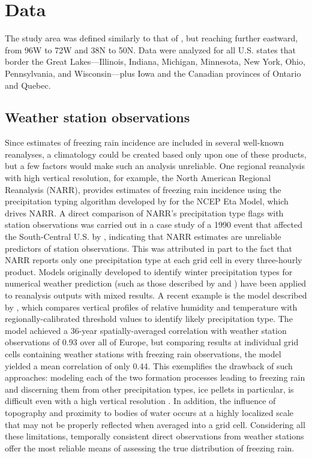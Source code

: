 \documentclass[twocol]{ametsoc}
\begin{document}
\section{Data}
The study area was defined similarly to that of \citet{cortinas2000climatology}, but reaching further eastward, from 96\degree W to 72\degree W and 38\degree N to 50\degree N. Data were analyzed for all U.S. states that border the Great Lakes---Illinois, Indiana, Michigan, Minnesota, New York, Ohio, Pennsylvania, and Wisconsin---plus Iowa and the Canadian provinces of Ontario and Quebec.

\subsection{Weather station observations}
Since estimates of freezing rain incidence are included in several well-known reanalyses, a climatology could be created based only upon one of these products, but a few factors would make such an analysis unreliable. One regional reanalysis with high vertical resolution, for example, the North American Regional Reanalysis (NARR), provides estimates of freezing rain incidence using the precipitation typing algorithm developed by \citet{baldwin1993development} for the NCEP Eta Model, which drives NARR. A direct comparison of NARR's precipitation type flags with station observations was carried out in a case study of a 1990 event that affected the South-Central U.S. by \citet{blunden2011138}, indicating that NARR estimates are unreliable predictors of station observations. This was attributed in part to the fact that NARR reports only one precipitation type at each grid cell in every three-hourly product. Models originally developed to identify winter precipitation types for numerical weather prediction (such as those described by \citet{cortinas2002probabilistic} and \citet{mullens2017multialgorithm}) have been applied to reanalysis outputs with mixed results. A recent example is the model described by \citet{kamarainen2017method}, which compares vertical profiles of relative humidity and temperature with regionally-calibrated threshold values to identify likely precipitation type. The model achieved a 36-year spatially-averaged correlation with weather station observations of 0.93 over all of Europe, but comparing results at individual grid cells containing weather stations with freezing rain observations, the model yielded a mean correlation of only 0.44. This exemplifies the drawback of such approaches: modeling each of the two formation processes leading to freezing rain and discerning them from other precipitation types, ice pellets in particular, is difficult even with a high vertical resolution \citep{reeves2014sources}. In addition, the influence of topography and proximity to bodies of water occurs at a highly localized scale that may not be properly reflected when averaged into a grid cell. Considering all these limitations, temporally consistent direct observations from weather stations offer the most reliable means of assessing the true distribution of freezing rain.
\end{document}

